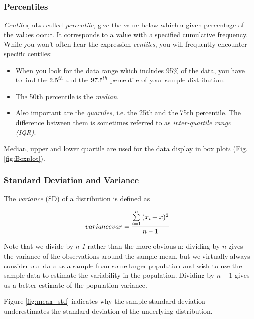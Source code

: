 \subsubsection{Percentiles}

\emph{Centiles}, also called \emph{percentile}, give the value below which a given percentage of the values occur. It corresponds to a value with a specified cumulative frequency. While you won't often hear the expression \emph{centiles}, you will frequently encounter specific centiles:

\begin{itemize}
  \item When you look for the data range which includes 95\% of the data, you have to find the $2.5^{th}$ and the $97.5^{th}$ percentile of your sample distribution.
  \item The 50th percentile is the \emph{median}.
  \item Also important are the \emph{quartiles}, i.e. the 25th and the 75th percentile. The difference between them is sometimes referred to as \emph{inter-quartile range (IQR)}.
\end{itemize}

Median, upper and lower quartile are used for the data display in box plots (Fig.\ref{fig:Boxplot}).

\subsubsection{Standard Deviation and Variance}
The \emph{variance} (SD) of a distribution is defined as

\begin{equation}\label{eq_variance} \index{general}{variance}
  var = \frac{{\sum\limits_{i = 1}^n {({x_i-\bar{x}})^2} }}{n-1}
\end{equation}

Note that we divide by \emph{n-1} rather than the more obvious n: dividing by $n$ gives the variance of the observations around the sample mean, but we virtually always consider our data as a sample from some larger population and wish to use the sample data to estimate the variability in the population. Dividing by $n-1$ gives us a better estimate of the population variance.

Figure \ref{fig:mean_std} indicates why the sample standard deviation underestimates the standard deviation of the underlying distribution.

